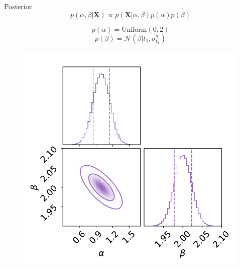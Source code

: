 \documentclass[
aspectratio=169,
14pt,
professionalfonts
]{beamer}
\begin{document}
\begin{frame}{Posterior}
\vspace{-1cm}
    $$p(\alpha, \beta|\boldsymbol{X}) \propto p(\boldsymbol{X}|\alpha, \beta) p(\alpha)p(\beta)$$
    \begin{minipage}{0.4\linewidth}
        $$p(\alpha) = \text{Uniform}(0,2)$$
        $$p(\beta) = \mathcal{N}(\beta | t_1, \sigma_{t_1}^2)$$
    \end{minipage}
    \begin{minipage}{0.59\linewidth}
    \begin{figure}
        \centering
        \includegraphics[width=0.8\linewidth]{../plots/posterior.pdf}
    \end{figure}
    \end{minipage}
\end{frame}
\end{document}
